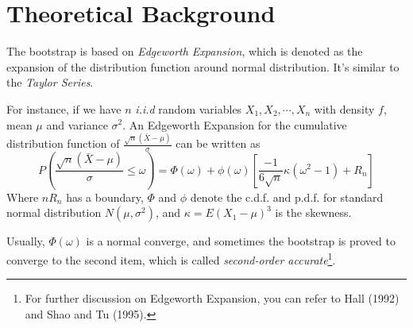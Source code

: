 \documentclass{journal}
\begin{document}
\section{Theoretical Background}
\par The bootstrap is based on \textit{Edgeworth Expansion}, which is denoted as the expansion of the distribution function around normal distribution. It's similar to the \emph{Taylor Series}.
\par For instance, if we have $n$ \textit{i.i.d} random variables $ X_1, X_2, \cdots, X_n $ with density $f$, mean $\mu$ and variance $\sigma^2$. An Edgeworth Expansion for the cumulative distribution function of $ \frac{\sqrt{n}(\bar{X}-\mu)}{\sigma} $ can be written as
\begin{equation}
P\left(\frac{\sqrt{n}(\bar{X}-\mu)}{\sigma}\leq\omega\right)=\Phi(\omega)+\phi(\omega)\left[\frac{-1}{6\sqrt{n}}\kappa\left(\omega^2-1\right)+R_n\right]\label{1}
\end{equation}
Where $ nR_n $ has a boundary, $ \Phi $ and $ \phi $ denote the c.d.f. and p.d.f. for standard normal distribution $ N(\mu,\sigma^2) $, and $ \kappa=E\left(X_1-\mu\right)^3 $ is the skewness.
\par Usually, $ \Phi(\omega) $ is a normal converge, and sometimes the bootstrap is proved to converge to the second item, which is called \textit{second-order accurate}\footnote{For further discussion on Edgeworth Expansion, you can refer to Hall (1992) and Shao and Tu (1995).}.
\end{document}
